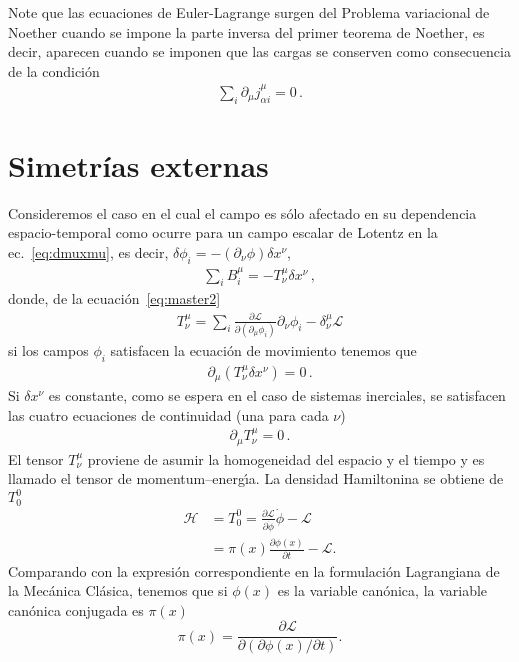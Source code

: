 Note que las ecuaciones de Euler-Lagrange surgen del Problema variacional de Noether cuando se impone la parte inversa del primer teorema de Noether, es decir, aparecen cuando se imponen que las cargas se conserven como consecuencia de la condición
\begin{align}
   \sum_i \partial_{\mu} j^{\mu}_{\alpha i}=0\,.
\end{align}


\section{Simetrías externas}
Consideremos el caso en el cual el campo es sólo afectado en su dependencia espacio-temporal como ocurre para un campo escalar de Lotentz en la ec.~\eqref{eq:dmuxmu}, es decir,
 $\delta\phi_{i}=-\left( \partial_{\nu}\phi \right)\delta x^{\nu}$,
\begin{align}
   \sum_i    B^{\mu}_i= - T^{\mu}_{\nu} \delta x^{\nu}\,,
\end{align}
donde, de la ecuación~\ref{eq:master2}
\begin{align}
  T^{\mu}_{\nu}=\sum_i \frac{\partial\mathcal{L}}{\partial(\partial_{\mu}\phi_i)}\partial_{\nu}\phi_i-\delta^{\mu}_{\nu}\mathcal{L}
\end{align}
si los campos $\phi_{i}$ satisfacen la ecuación de movimiento tenemos que
\begin{align}
  \partial_{\mu} \left( T^{\mu}_{\nu} \delta x^{\nu}\right)=0\,.
\end{align}
Si $\delta x^{\nu}$ es constante, como se espera en el caso de sistemas inerciales, se satisfacen las cuatro  ecuaciones de continuidad (una para cada $\nu$)
\begin{align}
  \partial_{\mu} T^{\mu}_{\nu}=0\,.
\end{align}
El tensor $T^\mu_\nu$ proviene de asumir la homogeneidad del espacio y el tiempo y es llamado el tensor de momentum--energ\'\i a. 
La densidad Hamiltonina se obtiene de $T^0_0$
\begin{align}
  \label{eq:3}
\mathcal{H}&=T^0_0=\frac{\partial\mathcal{L}}{\partial\dot{\phi}}\dot{\phi}
      -\mathcal{L}\\
      &=\pi(x)\frac{\partial\phi(x)}{\partial t}-\mathcal{L}.
\end{align}
Comparando con la expresi\'on correspondiente en la formulaci\'on
Lagrangiana de la Mec\'anica Cl\'asica, tenemos que si $\phi(x)$ es la
variable can\'onica, la variable can\'onica conjugada es $\pi(x)$
\begin{equation}
  \label{eq:4}
  \pi(x)=\frac{\partial\mathcal{L}}{\partial(\partial\phi(x)/\partial t)}.
\end{equation}
